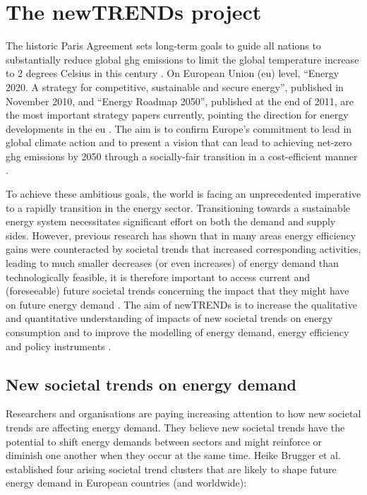 
\section{The newTRENDs project}

The historic Paris Agreement sets long-term goals to guide all nations to substantially reduce global \gls{ghg} emissions to limit the global temperature increase to 2 degrees Celsius in this century \cite{paris}. 
On European Union (\gls{eu}) level, “Energy 2020. A strategy for competitive, sustainable and secure energy”, published in November 2010, and “Energy Roadmap 2050”, published at the end of 2011, are the most important strategy papers currently, pointing the direction for energy developments in the \gls{eu} \cite{roadmap}. 
The aim is to confirm Europe's commitment to lead in global climate action and to present a vision that can lead to achieving net-zero \gls{ghg} emissions by 2050 through a socially-fair transition in a cost-efficient manner \cite{clean}. 

To achieve these ambitious goals, the world is facing an unprecedented imperative to a rapidly transition in the energy sector. 
Transitioning towards a sustainable energy system necessitates significant effort on both the demand and supply sides. 
However, previous research has shown that in many areas energy efficiency gains were counteracted by societal trends that increased corresponding activities, leading to much smaller decreases (or even increases) of energy demand than technologically feasible, it is therefore important to access current and (foreseeable) future societal trends concerning the impact that they might have on future energy demand \cite{2050}. 
The aim of newTRENDs is to increase the qualitative and quantitative understanding of impacts of new societal trends on energy consumption and to improve the modelling of energy demand, energy efficiency and policy instruments \cite{fraunhofer}. 

\subsection{New societal trends on energy demand}

Researchers and organisations are paying increasing attention to how new societal trends are affecting energy demand.
They believe new societal trends have the potential to shift energy demands between sectors and might reinforce or diminish one another when they occur at the same time. 
Heike Brugger et al. \cite{2050} established four arising societal trend clusters that are likely to shape future energy demand in European countries (and worldwide):  

